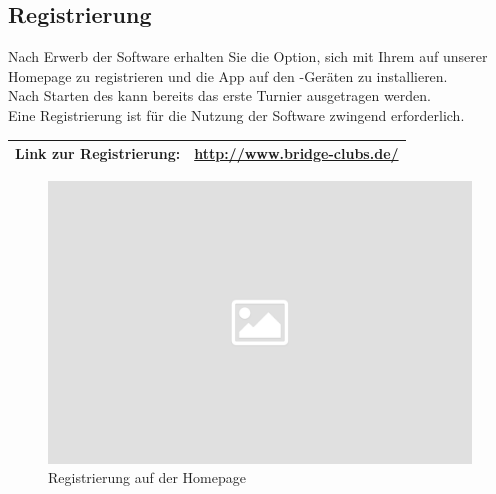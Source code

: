 \subsection{Registrierung}

\noindent
Nach Erwerb der \bb Software erhalten Sie die Option, sich mit Ihrem \bc auf
unserer Homepage zu registrieren und die
\bb App auf den \cli-Geräten zu installieren.\\ Nach Starten des \ser kann bereits das erste Turnier ausgetragen werden.\\[.2cm]

\noindent
Eine Registrierung ist für die Nutzung der \bb Software zwingend erforderlich.

\begin{center}
  \begin{tabular}{|ll|}
    \hline
    \textbf{Link zur Registrierung:} &\href{http://www.bridge-clubs.de/}{http://www.bridge-clubs.de/}\\
    \hline
  \end{tabular}
\end{center}

\noindent
\begin{figure}[ht]
	\centering
  \includegraphics[width=16cm]{pictures/placeholder.png}
	\caption{Registrierung auf der Homepage}
	\label{pic/reg}
\end{figure}
